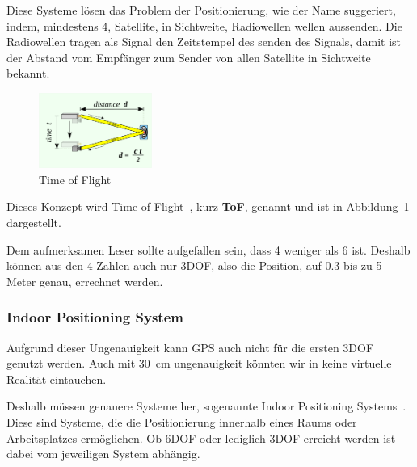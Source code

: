 Diese Systeme lösen das Problem der Positionierung, wie der Name suggeriert, indem, mindestens 4, Satellite, in Sichtweite, Radiowellen wellen aussenden.
Die Radiowellen tragen als Signal den Zeitstempel des senden des Signals, damit ist der Abstand vom Empfänger zum Sender von allen Satellite in Sichtweite bekannt.
\begin{figure}[ht!]
    \label{fig:ToF}
    \center
    \includegraphics[width={0.33\textwidth}]{../assets/img/time_of_flight}
    \caption{Time of Flight~\autocite{wikipedia-contributors-2023D}}
\end{figure}
Dieses Konzept wird Time of Flight~\autocite{wikipedia-contributors-2023D}, kurz \textbf{ToF}, genannt und ist in Abbildung~\ref{fig:ToF} dargestellt.

Dem aufmerksamen Leser sollte aufgefallen sein, dass 4 weniger als 6 ist.
Deshalb können aus den 4 Zahlen auch nur 3DOF, also die Position, auf 0.3 bis zu 5 Meter genau, errechnet werden.

\subsubsection{Indoor Positioning System}\label{subsubsec:indoor-positioning-system}
Aufgrund dieser Ungenauigkeit kann GPS auch nicht für die ersten 3DOF genutzt werden.
Auch mit 30~cm ungenauigkeit könnten wir in keine virtuelle Realität eintauchen.

Deshalb müssen genauere Systeme her, sogenannte Indoor Positioning Systems~\autocite{wikipedia-contributors-2023E}.
Diese sind Systeme, die die Positionierung innerhalb eines Raums oder Arbeitsplatzes ermöglichen.
Ob 6DOF oder lediglich 3DOF erreicht werden ist dabei vom jeweiligen System abhängig.


